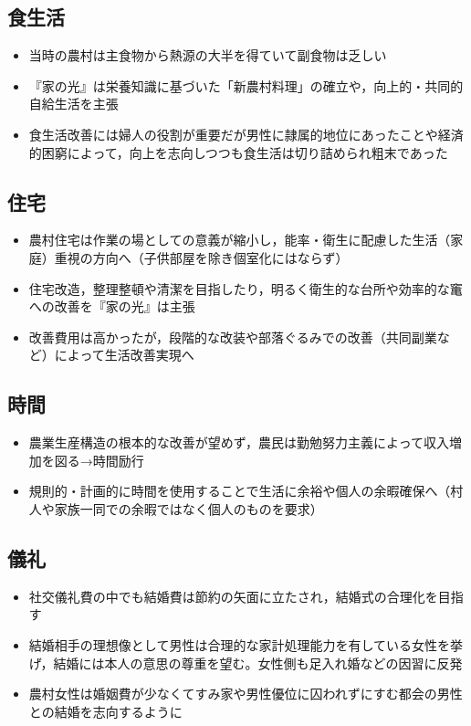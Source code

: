 \documentclass[11pt,autodetect-engine]{jsarticle}%
\begin{document}
 \subsection{食生活 }
 
 \begin{itemize}
  \item 当時の農村は主食物から熱源の大半を得ていて副食物は乏しい
  \item 『家の光』は栄養知識に基づいた「新農村料理」の確立や，向上的・共同的自給生活を主張
  \item 食生活改善には婦人の役割が重要だが男性に隷属的地位にあったことや経済的困窮によって，向上を志向しつつも食生活は切り詰められ粗末であった
\end{itemize}

 \subsection{住宅 }
 
 \begin{itemize}
  \item 農村住宅は作業の場としての意義が縮小し，能率・衛生に配慮した生活（家庭）重視の方向へ（子供部屋を除き個室化にはならず）
  \item 住宅改造，整理整頓や清潔を目指したり，明るく衛生的な台所や効率的な竃への改善を『家の光』は主張
  \item 改善費用は高かったが，段階的な改装や部落ぐるみでの改善（共同副業など）によって生活改善実現へ
\end{itemize}


 \subsection{時間 }
 
 \begin{itemize}
  \item 農業生産構造の根本的な改善が望めず，農民は勤勉努力主義によって収入増加を図る→時間励行
  \item 規則的・計画的に時間を使用することで生活に余裕や個人の余暇確保へ（村人や家族一同での余暇ではなく個人のものを要求）
\end{itemize}

 \subsection{儀礼 }
 
 \begin{itemize}
  \item 社交儀礼費の中でも結婚費は節約の矢面に立たされ，結婚式の合理化を目指す
  \item 結婚相手の理想像として男性は合理的な家計処理能力を有している女性を挙げ，結婚には本人の意思の尊重を望む。女性側も足入れ婚などの因習に反発
  \item 農村女性は婚姻費が少なくてすみ家や男性優位に囚われずにすむ都会の男性との結婚を志向するように
\end{itemize}
\end{document}

